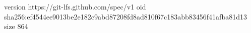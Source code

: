 version https://git-lfs.github.com/spec/v1
oid sha256:ef4544ee9013be2e182c9abd87208fd8ad810f67c183abb83456f41afba81d13
size 864
